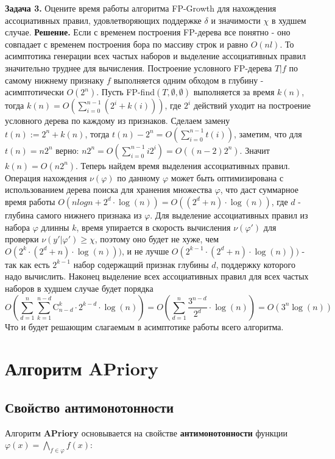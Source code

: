 \newline\newline
\textbf{Задача 3.}
Оцените время работы алгоритма FP-Growth для нахождения ассоциативных правил, удовлетворяющих поддержке $\delta$ и значимости $\chi$ в худшем случае.
\newline\newline
\textbf{Решение.}
\newline
Если с временем построения FP-дерева все понятно - оно совпадает с временем построения бора по массиву строк и равно $O(nl)$. То асимптотика генерации всех частых наборов и выделение ассоциативных правил значительно труднее для вычисления. Построение условного FP-дерева $T|f$ по самому нижнему признаку $f$ выполняется одним обходом в глубину - асимптотически $O(2^n)$. Пусть FP-find$(T,\emptyset,\emptyset)$ выполняется за время $k(n)$, тогда $k(n) = O\left(\sum_{i = 0}^{n-1} (2^i + k(i))\right)$, где $2^i$ действий уходит на построение условного дерева по каждому из признаков. Сделаем замену $t(n):=2^n+k(n)$, тогда $t(n) - 2^n = O\left(\sum_{i = 0}^{n-1}t(i)\right)$, заметим, что для $t(n) = n2^n$ верно: $n2^n = O\left(\sum_{i = 0}^{n-1} i2^i\right) = O((n-2)2^n)$. Значит $k(n) = O(n2^n)$. Теперь найдем время выделения ассоциативных правил. Операция нахождения $\nu(\varphi)$ по данному $\varphi$ может быть оптимизирована с использованием дерева поиска для хранения множества $\varphi$, что даст суммарное время работы $O(nlogn + 2^d\cdot \log(n)) = O((2^d + n)\cdot \log(n))$, где $d$ - глубина самого нижнего признака из $\varphi$. Для выделение ассоциативных правил из набора $\varphi$ длинны $k$, время упирается в скорость вычисления $\nu(\varphi')$ для проверки $\nu(y' | \varphi') \geq \chi$, поэтому оно будет не хуже, чем $O(2^k \cdot (2^d + n)\cdot \log(n)))$, и не лучше $O(2^{k-1} \cdot (2^d + n)\cdot \log(n)))$ - так как есть $2^{k-1}$ набор содержащий признак глубины $d$, поддержку которого надо вычислить. Наконец выделение всех ассоциативных правил для всех частых наборов в худшем случае будет порядка
$$O\left(\sum_{d = 1}^{n} \sum_{k = 1}^{n-d} \mathrm{C}_{n-d}^{k} \cdot 2^{k-d}\cdot \log(n) \right) =
    O\left(\sum_{d = 1}^{n} \frac{3^{n-d}}{2^d} \cdot\log(n) \right) =O(3^n \log(n))  $$
Что и будет решающим слагаемым в асимптотике работы всего алгоритма.


\section{Алгоритм APriory}

\subsection{Свойство антимонотонности}
Алгоритм \textbf{APriory} основывается на свойстве \textbf{антимонотонности} функции \( \varphi(x)= \bigwedge_{f \in \varphi} f(x)\):

